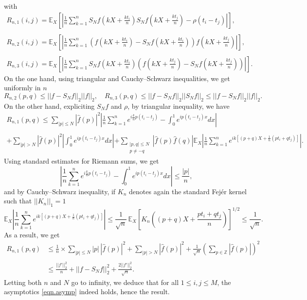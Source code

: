 \documentclass{svproc}
\begin{document}
with 
\[
\begin{array}{l}
R_{n,1}(i,j) = \mathbb E_X \left[\left|  \frac{1}{n}\sum_{k=1}^{n}S_N f\left(kX+\frac{kt_i}{n}\right)S_N f\left(kX+\frac{kt_j}{n}\right)- \rho(t_i-t_j)\right|\right],\\
\\
R_{n,2}(i,j) = \mathbb E_X \left[\left|  \frac{1}{n}\sum_{k=1}^{n}\left( f\left(kX+\frac{kt_i}{n}\right) -S_N f\left(kX+\frac{kt_i}{n}\right)\right) f\left(kX+\frac{kt_j}{n}\right)\right|\right],\\
\\
R_{n,3}(i,j) = \mathbb E_X \left[\left|  \frac{1}{n}\sum_{k=1}^{n} S_N f \left(kX+\frac{kt_i}{n}\right)\left( f\left(kX+\frac{kt_j}{n}\right) -S_N f\left(kX+\frac{kt_j}{n}\right)\right) \right|\right].
\end{array}
\]
On the one hand, using triangular and Cauchy--Schwarz inequalities, we get uniformly in $n$
\[
R_{n,2}(p,q) \leq || f-S_N f||_2 ||f||_2, \quad R_{n,3}(p,q) \leq || f-S_N f||_2 ||S_N f||_2\leq || f-S_N f||_2 || f||_2.
\]
On the other hand, expliciting $S_Nf$ and $\rho$, by triangular inequality, we have 
\[
\begin{array}{l}
R_{n,1}(p,q) \leq \displaystyle{\sum_{|p| \leq N} |\widehat{f}(p)|^2 \left| \frac{1}{n}\sum_{k=1}^{n} e^{i \frac{k}{n} p (t_i-t_j)} - \int_0^{1}e^{ip(t_i-t_j)x}dx\right|} \\
\\
+\displaystyle{ \sum_{|p|> N} |\widehat{f}(p)|^2 \left| \int_0^{1}e^{ip(t_i-t_j)x}dx\right|} 
\displaystyle{+ \sum_{\substack{|p,q| \leq N \\ p\neq -q}} |\widehat{f}(p)\widehat{f}(q)| \mathbb E_X \left| \frac{1}{n}\sum_{k=1}^{n} e^{i k [(p+q) X + \frac{1}{n} (p t_i+q t_j)]}\right|}.
\end{array}
\]
Using standard estimates for Riemann sums, we get 
\[
\left| \frac{1}{n}\sum_{k=1}^{n} e^{i \frac{k}{n} p (t_i-t_j)} - \int_0^{1}e^{ip(t_i-t_j)x}dx\right| \leq \frac{|p|}{n},
 \]
and by Cauchy--Schwarz inequality, if $K_n$ denotes again the standard Fej\'er kernel such that $||K_n||_1=1$
\[
\mathbb E_X \left| \frac{1}{n}\sum_{k=1}^{n} e^{i k [(p+q) X + \frac{1}{n} (p t_i+q t_j)]}\right| \leq \frac{1}{\sqrt{n}} \, \mathbb E_X \left[K_n\left((p+q)X +\frac{pt_i+q t_j}{n}\right)\right]^{1/2}\leq \frac{1}{\sqrt{n}}.
\]
As a result, we get 
\[
\begin{array}{ll}
R_{n,1}(p,q) & \leq \displaystyle{\frac{1}{n} \times \sum_{|p| \leq N} |p| \, |\widehat{f}(p)|^2 + \sum_{|p|> N} |\widehat{f}(p)|^2 + \frac{1}{\sqrt{n}} \left(\sum_{p \in \mathbb Z}  |\widehat{f}(p)|\right)^2}\\
\\
& \displaystyle{\leq \frac{||f'||_2^2}{n} + || f-S_N f||_2^2 + \frac{2 ||f'||_2^2}{\sqrt{n}}.}
\end{array}
\]
Letting both $n$ and $N$ go to infinity, we deduce that for all $1\leq i,j\leq M$, the asymptotics \eqref{eqn.asymp} indeed holds, hence the result.
\end{document}

